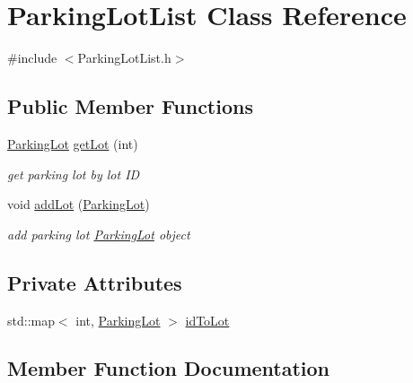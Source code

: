 \hypertarget{class_parking_lot_list}{}\section{Parking\+Lot\+List Class Reference}
\label{class_parking_lot_list}


{\ttfamily \#include $<$Parking\+Lot\+List.\+h$>$}

\subsection*{Public Member Functions}
\begin{DoxyCompactItemize}
\item 
\mbox{\hyperlink{class_parking_lot}{Parking\+Lot}} \mbox{\hyperlink{class_parking_lot_list_ae2b85aa157c306ebbac0c34dca35547b}{get\+Lot}} (int)
\begin{DoxyCompactList}\small\item\em get parking lot by lot ID \end{DoxyCompactList}\item 
void \mbox{\hyperlink{class_parking_lot_list_ac87cd76fdbbfdca51927dad1a9e9b4e3}{add\+Lot}} (\mbox{\hyperlink{class_parking_lot}{Parking\+Lot}})
\begin{DoxyCompactList}\small\item\em add parking lot \mbox{\hyperlink{class_parking_lot}{Parking\+Lot}} object \end{DoxyCompactList}\end{DoxyCompactItemize}
\subsection*{Private Attributes}
\begin{DoxyCompactItemize}
\item 
std\+::map$<$ int, \mbox{\hyperlink{class_parking_lot}{Parking\+Lot}} $>$ \mbox{\hyperlink{class_parking_lot_list_a6041b1720559ec708d78eeb6e9ffe314}{id\+To\+Lot}}
\end{DoxyCompactItemize}


\subsection{Member Function Documentation}
\mbox{\label{class_parking_lot_list_ac87cd76fdbbfdca51927dad1a9e9b4e3}} 
